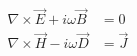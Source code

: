 \begin{equation}
\begin{split}
    \nabla \times \vec{E} + i \omega\vec{B} &= 0 \\
    \nabla \times \vec{H} - i \omega\vec{D} &= \vec{J}
\end{split}
\label{eq:maxwell_freq_full}
\end{equation}
